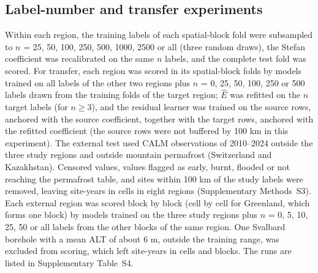 \subsection{Label-number and transfer experiments}
Within each region, the training labels of each spatial-block fold were subsampled to $n$ = 25, 50, 100, 250, 500, 1000, 2500 or all (three random draws), the Stefan coefficient was recalibrated on the same $n$ labels, and the complete test fold was scored. For transfer, each region was scored in its spatial-block folds by models trained on all labels of the other two regions plus $n$ = 0, 25, 50, 100, 250 or 500 labels drawn from the training folds of the target region; $\hat{E}$ was refitted on the $n$ target labels (for $n\geq3$), and the residual learner was trained on the source rows, anchored with the source coefficient, together with the target rows, anchored with the refitted coefficient (the source rows were not buffered by 100 km in this experiment). The external test used CALM observations of 2010--2024\cite{Streletskiy2025} outside the three study regions and outside mountain permafrost (Switzerland and Kazakhstan). Censored values, values flagged as early, burnt, flooded or not reaching the permafrost table, and sites within 100 km of the study labels were removed, leaving \nextcy{} site-years in \nextcells{} cells in eight regions (Supplementary Methods~S3). Each external region was scored block by block (cell by cell for Greenland, which forms one block) by models trained on the three study regions plus $n$ = 0, 5, 10, 25, 50 or all labels from the other blocks of the same region. One Svalbard borehole with a mean ALT of about 6 m, outside the training range, was excluded from scoring, which left \nftScoredRows{} site-years in \nftScoredCells{} cells and \nftScoredBlocks{} blocks. The runs are listed in Supplementary Table~S4.

